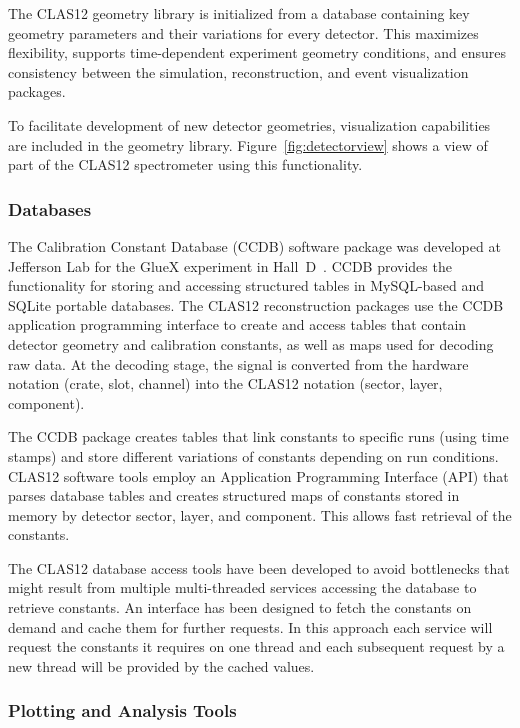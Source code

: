 The CLAS12 geometry library is initialized from a database containing key geometry parameters and their
variations for every detector.  This maximizes flexibility, supports time-dependent experiment geometry
conditions, and ensures consistency between the simulation, reconstruction, and event visualization packages.

To facilitate development of new detector geometries, visualization capabilities are included in the geometry library.
Figure~\ref{fig:detectorview} shows a view of part of the CLAS12 spectrometer using this functionality.

\subsubsection{Databases}

The Calibration Constant Database (CCDB) software package was developed at Jefferson Lab for the GlueX
experiment in Hall~D~\cite{gluex}.  CCDB provides the functionality for storing and accessing structured tables in
MySQL-based and SQLite portable databases. The CLAS12 reconstruction packages use the CCDB application
programming interface to create and access tables that contain detector geometry and calibration constants, as
well as maps used for decoding raw data. At the decoding stage, the signal is converted from the hardware notation
(crate, slot, channel) into the CLAS12 notation (sector, layer, component). 

The CCDB package creates tables that link constants to specific runs (using time stamps) and store different
variations of constants depending on run conditions. CLAS12 software tools employ an Application Programming
Interface (API) that parses database tables and creates structured maps of constants stored in  memory by
detector sector, layer, and component. This allows fast retrieval of the constants.

The CLAS12 database access tools have been developed to avoid bottlenecks that might result from multiple
multi-threaded services accessing the database to retrieve constants.  An interface has been designed to fetch
the constants on demand and cache them for further requests. In this approach each service will request the
constants it requires on one thread and each subsequent request by a new thread will be provided by the cached
values.

\subsubsection{Plotting and Analysis Tools}

